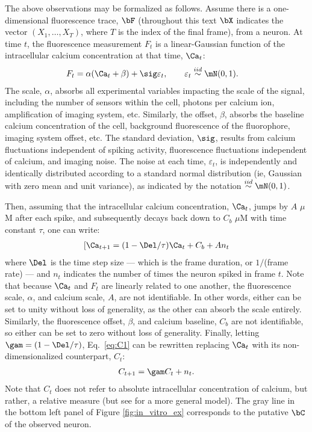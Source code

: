 The above observations may be formalized as follows. Assume there is a one-dimensional fluorescence trace, $\bF$ (throughout this text $\bX$ indicates the vector $(X_1, \ldots, X_T)$, where $T$ is the index of the final frame), from a neuron.  At time $t$, the fluorescence measurement $F_t$ is a linear-Gaussian function of the intracellular calcium concentration at that time, $\Ca_t$:
\begin{align} \label{eq:F}
F_t &= \alpha (\Ca_t + \beta) + \sig \varepsilon_t, \qquad \varepsilon_t \overset{iid}{\sim} \mN(0,1).
\end{align}
\noindent The scale, $\alpha$, absorbs all experimental variables impacting the scale of the signal, including the number of sensors within the cell, photons per calcium ion, amplification of imaging system, etc.  Similarly, the offset, $\beta$, absorbs the baseline calcium concentration of the cell, background fluorescence of the fluorophore, imaging system offset, etc.  The standard deviation, $\sig$, results from calcium fluctuations independent of spiking activity, fluorescence fluctuations independent of calcium, and imaging noise. The noise at each time, $\varepsilon_t$, is independently and identically distributed according to a standard normal distribution (ie, Gaussian with zero mean and unit variance), as indicated by the notation $\overset{iid}{\sim}\mN(0,1)$. 

Then, assuming that the intracellular calcium concentration, $\Ca_t$, jumps by $A$ $\mu$M after each spike, and subsequently decays back down to $C_b$ $\mu$M with time constant $\tau$, one can write:
\begin{align} \label{eq:C1}
[\Ca_{t+1} = (1- \Del/\tau ) \Ca_t + C_b + A n_t
\end{align}
\noindent where $\Del$ is the time step size --- which is the frame duration, or $1/$(frame rate) --- and $n_t$ indicates the number of times the neuron spiked in frame $t$. %
Note that because $\Ca_t$ and $F_t$ are linearly related to one another, the fluorescence scale, $\alpha$, and calcium scale, $A$, are not identifiable.  In other words, either can be set to unity without loss of generality, as the other can absorb the scale entirely. Similarly, the fluorescence offset, $\beta$, and calcium baseline, $C_b$ are not identifiable, so either can be set to zero without loss of generality.  Finally, letting $\gam=(1-\Del/\tau)$, Eq.~\eqref{eq:C1} can be rewritten replacing $\Ca_t$ with its non-dimensionalized counterpart, $C_t$: 
\begin{align} \label{eq:C2}
	 C_{t+1}=\gam C_t + n_t.
\end{align} 
\noindent Note that $C_t$ does not refer to absolute intracellular concentration of calcium, but rather, a relative measure (but see \cite{VogelsteinPaninski09} for a more general model).  The gray line in the bottom left panel of Figure \ref{fig:in_vitro_ex} corresponds to the putative $\bC$ of the observed neuron.  

